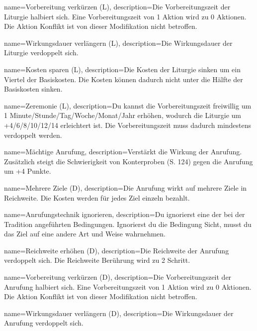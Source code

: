 {
    name={Vorbereitung verkürzen (L)},
    description={Die Vorbereitungszeit der Liturgie halbiert sich. Eine Vorbereitungszeit von 1 Aktion wird zu 0 Aktionen. Die Aktion Konflikt ist von dieser Modifikation nicht betroffen.}
}


{
    name={Wirkungsdauer verlängern (L)},
    description={Die Wirkungsdauer der Liturgie verdoppelt sich.}
}


{
    name={Kosten sparen (L)},
    description={Die Kosten der Liturgie sinken um ein Viertel der Basiskosten. Die Kosten können dadurch nicht unter die Hälfte der Basiskosten sinken.}
}


{
    name={Zeremonie (L)},
    description={Du kannst die Vorbereitungszeit freiwillig um 1 Minute/Stunde/Tag/Woche/Monat/Jahr erhöhen, wodurch die Liturgie um +4/6/8/10/12/14 erleichtert ist. Die Vorbereitungszeit muss dadurch mindestens verdoppelt werden.}
}


{
    name={Mächtige Anrufung},
    description={Verstärkt die Wirkung der Anrufung. Zusätzlich steigt die Schwierigkeit von Konterproben (S. 124) gegen die Anrufung um +4 Punkte.}
}


{
    name={Mehrere Ziele (D)},
    description={Die Anrufung wirkt auf mehrere Ziele in Reichweite. Die Kosten werden für jedes Ziel einzeln bezahlt.}
}


{
    name={Anrufungstechnik ignorieren},
    description={Du ignorierst eine der bei der Tradition angeführten Bedingungen. Ignorierst du die Bedingung Sicht, musst du das Ziel auf eine andere Art und Weise wahrnehmen.}
}


{
    name={Reichweite erhöhen (D)},
    description={Die Reichweite der Anrufung verdoppelt sich. Die Reichweite Berührung wird zu 2 Schritt.}
}


{
    name={Vorbereitung verkürzen (D)},
    description={Die Vorbereitungszeit der Anrufung halbiert sich. Eine Vorbereitungszeit von 1 Aktion wird zu 0 Aktionen. Die Aktion Konflikt ist von dieser Modifikation nicht betroffen.}
}


{
    name={Wirkungsdauer verlängern (D)},
    description={Die Wirkungsdauer der Anrufung verdoppelt sich.}
}


